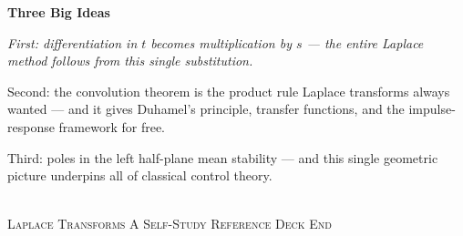 \documentclass[aspectratio=169,11pt]{beamer}
\begin{document}
{
\begin{frame}[plain]
\vspace{1.2cm}
\begin{center}
{\color{white}\Huge\textbf{Three Big Ideas}}\\[0.8cm]
\begin{minipage}{0.85\textwidth}
{\color{white}\large\itshape
First: differentiation in $t$ becomes multiplication by $s$ --- the entire Laplace method follows from this single substitution.

\medskip
Second: the convolution theorem is the product rule Laplace transforms always wanted --- and it gives Duhamel's principle, transfer functions, and the impulse-response framework for free.

\medskip
Third: poles in the left half-plane mean stability --- and this single geometric picture underpins all of classical control theory.}
\end{minipage}\\[1cm]
{\color{white!85}\footnotesize\textsc{Laplace Transforms \quad\textbar\quad A Self-Study Reference Deck \quad\textbar\quad End}}
\end{center}
\end{frame}
}
\end{document}
